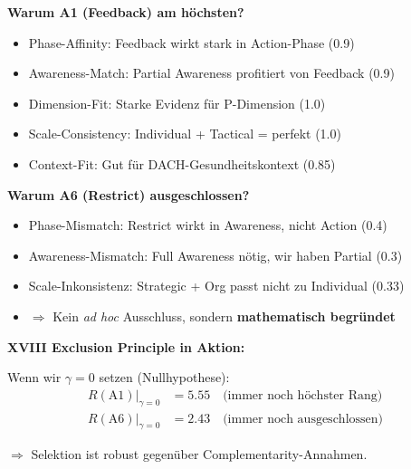 \begin{tcolorbox}[colback=red!5!white, colframe=red!75!black,
    title=\textbf{Schritt 6: Validierung --- Warum diese Auswahl?}]

\textbf{Warum A1 (Feedback) am höchsten?}
\begin{itemize}[nosep]
    \item Phase-Affinity: Feedback wirkt stark in Action-Phase (0.9)
    \item Awareness-Match: Partial Awareness profitiert von Feedback (0.9)
    \item Dimension-Fit: Starke Evidenz für P-Dimension (1.0)
    \item Scale-Consistency: Individual + Tactical = perfekt (1.0)
    \item Context-Fit: Gut für DACH-Gesundheitskontext (0.85)
\end{itemize}

\textbf{Warum A6 (Restrict) ausgeschlossen?}
\begin{itemize}[nosep]
    \item Phase-Mismatch: Restrict wirkt in Awareness, nicht Action (0.4)
    \item Awareness-Mismatch: Full Awareness nötig, wir haben Partial (0.3)
    \item Scale-Inkonsistenz: Strategic + Org passt nicht zu Individual (0.33)
    \item $\Rightarrow$ Kein \textit{ad hoc} Ausschluss, sondern \textbf{mathematisch begründet}
\end{itemize}

\textbf{XVIII Exclusion Principle in Aktion:}

Wenn wir $\gamma = 0$ setzen (Nullhypothese):
\begin{align*}
R(\text{A1})|_{\gamma=0} &= 5.55 \quad \text{(immer noch höchster Rang)} \\
R(\text{A6})|_{\gamma=0} &= 2.43 \quad \text{(immer noch ausgeschlossen)}
\end{align*}

$\Rightarrow$ Selektion ist robust gegenüber Complementarity-Annahmen.

\end{tcolorbox}


